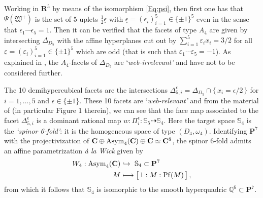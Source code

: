 \documentclass[11pt]{amsart}
\begin{document}
 Working in $\mathbf R^5$ by means of the isomorphism \eqref{Eq:psi}, then first 
 one has that $\Psi(\mathfrak W^+)$ is the set of 5-uplets $\frac{1}{2}\underline{\epsilon}$ 
 with $\underline{\epsilon}= (\epsilon_i)_{i=1}^5\in \{\pm 1\}^5$ even in the sense that $\epsilon_1\cdots \epsilon_5=1$. Then 
 it can be verified that the facets of type $A_4$ are given by intersecting $\Delta_{D_5}$ with the affine hyperplanes cut out by $\sum_{i=1}^5 \varepsilon_i x_i=3/2$ for all  $\underline{\varepsilon}=(\varepsilon_i )_{i=1}^5 \in \{\pm 1\}^5$ which are odd (that is such that $\varepsilon_1\cdots \varepsilon_5=-1$).  As explained in \cite{PirioAFST}, the $A_4$-facets of $\Delta_{D_5}$ are `{\it web-irrelevant'} and have not to be considered further.  
 
 The 10 demihypercubical facets are the intersections $\Delta_{5,i}^\epsilon=\Delta_{D_5}\cap \{ \, x_i= \epsilon/2\, \}$ for $i=1,\ldots,5$ and $\epsilon\in \{\pm 1\}$.  These 10 facets are `{\it web-relevant'} and from the material of  \cite[\S4.5]{PirioAFST} (in particular Figure 1 therein), we can see that the face map associated 
 to the facet $\Delta_{5,i}^\epsilon$ is a dominant rational map $w:\Pi_i^\epsilon : \mathbb S_5\dashrightarrow \mathbb S_4$. Here the target space $\mathbb S_4$ is the {\it `spinor 6-fold'}: it is the homogeneous space of type $(D_4,\omega_4)$. 
  Identifying $\mathbf P^7$ with the projectivization of $\mathbf C\oplus {\rm Asym}_4(\mathbf C) \oplus \mathbf C\simeq \mathbf C^8$, the spinor 6-fold  admits an affine  parametrization {\it \`a la Wick} given by 
\begin{align*}%
 W_4: {\rm Asym}_4(\mathbf C)& \hookrightarrow \, \, \mathbb S_4\subset \mathbf P^7\\ 
 M& \longmapsto \big[ \, 1 :  M  :  {\rm Pf}(M)\, 
  \big]\, ,
\end{align*}%
    from which it follows that 
$\mathbb S_4$ is isomorphic to the smooth hyperquadric $\mathbb Q^6\subset \mathbf P^7$.    
 
 
\end{document}
